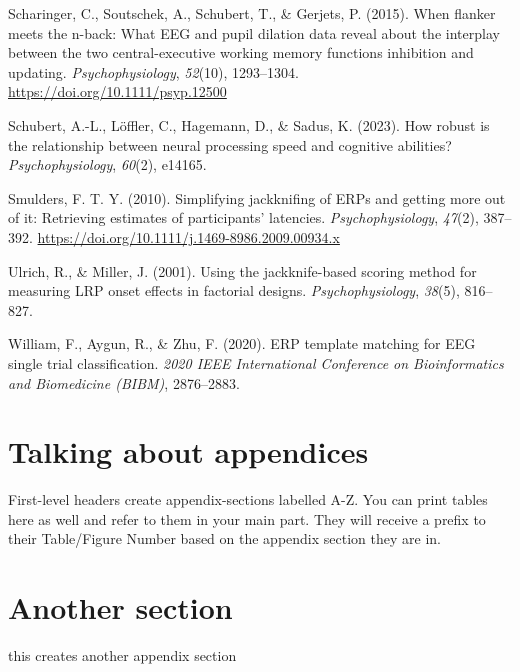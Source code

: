 \documentclass[
  man,floatsintext]{apa7}
\newlength{\cslhangindent}
\newlength{\cslentryspacingunit} %
\newenvironment{CSLReferences}[2] %
 {%
  \setlength{\parindent}{0pt}
  \ifodd #1
  \let\oldpar\par
  \def\par{\hangindent=\cslhangindent\oldpar}
  \fi
  \setlength{\parskip}{#2\cslentryspacingunit}
 }%
 {}
\begin{document}
\begin{CSLReferences}{1}{0}
\leavevmode{}%
Scharinger, C., Soutschek, A., Schubert, T., \& Gerjets, P. (2015). When flanker meets the n-back: {What} {EEG} and pupil dilation data reveal about the interplay between the two central-executive working memory functions inhibition and updating. \emph{Psychophysiology}, \emph{52}(10), 1293--1304. \url{https://doi.org/10.1111/psyp.12500}

\leavevmode{}%
Schubert, A.-L., Löffler, C., Hagemann, D., \& Sadus, K. (2023). How robust is the relationship between neural processing speed and cognitive abilities? \emph{Psychophysiology}, \emph{60}(2), e14165.

\leavevmode{}%
Smulders, F. T. Y. (2010). Simplifying jackknifing of {ERPs} and getting more out of it: {Retrieving} estimates of participants' latencies. \emph{Psychophysiology}, \emph{47}(2), 387--392. \url{https://doi.org/10.1111/j.1469-8986.2009.00934.x}

\leavevmode{}%
Ulrich, R., \& Miller, J. (2001). Using the jackknife-based scoring method for measuring {LRP} onset effects in factorial designs. \emph{Psychophysiology}, \emph{38}(5), 816--827.

\leavevmode{}%
William, F., Aygun, R., \& Zhu, F. (2020). {ERP} template matching for {EEG} single trial classification. \emph{2020 {IEEE} International Conference on Bioinformatics and Biomedicine ({BIBM})}, 2876--2883.

\end{CSLReferences}

\newpage

\hypertarget{appendix-appendix}{%
\appendix}


\hypertarget{talking-about-appendices}{%
\section{Talking about appendices}\label{talking-about-appendices}}

First-level headers create appendix-sections labelled A-Z. You can print tables here as well and refer to them in your main part. They will receive a prefix to their Table/Figure Number based on the appendix section they are in.

\hypertarget{another-section}{%
\section{Another section}\label{another-section}}

this creates another appendix section
\end{document}
